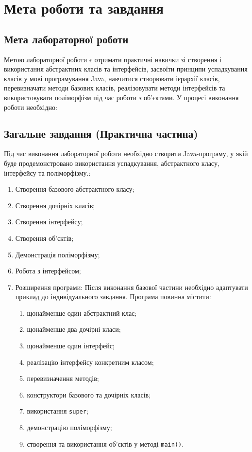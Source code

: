 \section{Мета роботи та завдання}

\subsection{Мета лабораторної роботи}

Метою лабораторної роботи є отримати практичні навички зі створення і використання 
абстрактних класів та інтерфейсів, засвоїти принципи успадкування класів у мові 
програмування Java, навчитися створювати ієрархії класів, перевизначати методи 
базових класів, реалізовувати методи інтерфейсів та використовувати поліморфізм 
під час роботи з об’єктами. У процесі виконання роботи необхідно:

\subsection{Загальне завдання (Практична частина)}

Під час виконання лабораторної роботи необхідно створити Java-програму, у якій 
буде продемонстровано використання успадкування, абстрактного класу, інтерфейсу 
та поліморфізму.:
\begin{enumerate}
    \item Створення базового абстрактного класу;
    \item Створення дочірніх класів;
    \item Створення інтерфейсу;
    \item Створення об’єктів;
    \item Демонстрація поліморфізму;
    \item Робота з інтерфейсом;
    \item Розширення програми:
    Після виконання базової частини необхідно адаптувати приклад до індивідуального завдання.
Програма повинна містити:
    \begin{enumerate}
        \item щонайменше один абстрактний клас;
        \item щонайменше два дочірні класи;
        \item щонайменше один інтерфейс;
        \item реалізацію інтерфейсу конкретним класом;
        \item перевизначення методів;
        \item конструктори базового та дочірніх класів;
        \item використання \texttt{super};
        \item демонстрацію поліморфізму;
        \item створення та використання об’єктів у методі \texttt{main()}.
    \end{enumerate}

\end{enumerate}

